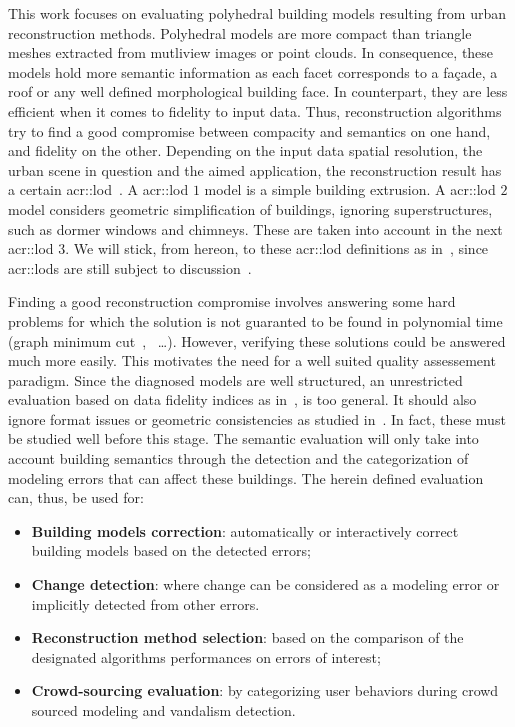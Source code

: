 \documentclass[runningheads]{llncs}
\begin{document}
    This work focuses on evaluating polyhedral building models resulting from urban reconstruction methods. Polyhedral models are more compact than triangle meshes extracted from mutliview images or point clouds. In consequence, these models hold more semantic information as each facet corresponds to a fa\c{c}ade, a roof or any well defined morphological building face. In counterpart, they are less efficient when it comes to fidelity to input data. Thus, reconstruction algorithms try to find a good compromise between compacity and semantics on one hand, and fidelity on the other. Depending on the input data spatial resolution, the urban scene in question and the aimed application, the reconstruction result has a certain \acrfull{acr::lod}~\cite{kolbe2005citygml}. A \acrshort{acr::lod} $1$ model is a simple building extrusion. A \acrshort{acr::lod} $2$ model considers geometric simplification of buildings, ignoring superstructures, such as dormer windows and chimneys. These are taken into account in the next \acrshort{acr::lod} $3$. We will stick, from hereon, to these \acrshort{acr::lod} definitions as in~\cite{verdie2015lod}, since \glspl{acr::lod} are still subject to discussion~\cite{2016_ceus_improved_lod}.
    
     Finding a good reconstruction compromise involves answering some hard problems for which the solution is not guaranted to be found in polynomial time {\color{blue} (graph minimum cut~\cite{Taillandier2005},~\cite{Bredif2008} \dots)}. However, verifying these solutions could be answered much more easily. This motivates the need for a well suited quality assessement paradigm. Since the diagnosed models are well structured, an unrestricted evaluation based on data fidelity indices as in~\cite{berger2013benchmark}, is too general. It should also ignore format issues or geometric consistencies as studied in~\cite{ledoux2018val3dity}. In fact, these must be studied well before this stage. The semantic evaluation will only take into account building semantics through the detection and the categorization of modeling errors that can affect these buildings. The herein defined evaluation can, thus, be used for:
    \begin{itemize}
        \item \textbf{Building models correction}: automatically or interactively correct building models based on the detected errors;
        \item \textbf{Change detection}: where change can be considered as a modeling error or implicitly detected from other errors.
        \item \textbf{Reconstruction method selection}: based on the comparison of the designated algorithms performances on errors of interest;
        \item \textbf{Crowd-sourcing evaluation}: by categorizing user behaviors during crowd sourced modeling and vandalism detection.
    \end{itemize}
\end{document}

